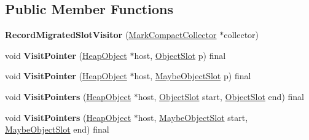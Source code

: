 \subsection*{Public Member Functions}
\begin{DoxyCompactItemize}
\item 
\mbox{\label{classv8_1_1internal_1_1RecordMigratedSlotVisitor_a293de89eb85dd53543ee17300e50f246}} 
{\bfseries Record\+Migrated\+Slot\+Visitor} (\mbox{\hyperlink{classv8_1_1internal_1_1MarkCompactCollector}{Mark\+Compact\+Collector}} $\ast$collector)
\item 
\mbox{\label{classv8_1_1internal_1_1RecordMigratedSlotVisitor_a95521fe2007eb5e871833d6822d26628}} 
void {\bfseries Visit\+Pointer} (\mbox{\hyperlink{classv8_1_1internal_1_1HeapObject}{Heap\+Object}} $\ast$host, \mbox{\hyperlink{classv8_1_1internal_1_1ObjectSlot}{Object\+Slot}} p) final
\item 
\mbox{\label{classv8_1_1internal_1_1RecordMigratedSlotVisitor_a78d47a48da4aa446003f8e91bda66d94}} 
void {\bfseries Visit\+Pointer} (\mbox{\hyperlink{classv8_1_1internal_1_1HeapObject}{Heap\+Object}} $\ast$host, \mbox{\hyperlink{classv8_1_1internal_1_1MaybeObjectSlot}{Maybe\+Object\+Slot}} p) final
\item 
\mbox{\label{classv8_1_1internal_1_1RecordMigratedSlotVisitor_a437a096ec8e71de7039dc9e1034d63e0}} 
void {\bfseries Visit\+Pointers} (\mbox{\hyperlink{classv8_1_1internal_1_1HeapObject}{Heap\+Object}} $\ast$host, \mbox{\hyperlink{classv8_1_1internal_1_1ObjectSlot}{Object\+Slot}} start, \mbox{\hyperlink{classv8_1_1internal_1_1ObjectSlot}{Object\+Slot}} end) final
\item 
\mbox{\label{classv8_1_1internal_1_1RecordMigratedSlotVisitor_a0efe11b186d86f633f615656fd215cd3}} 
void {\bfseries Visit\+Pointers} (\mbox{\hyperlink{classv8_1_1internal_1_1HeapObject}{Heap\+Object}} $\ast$host, \mbox{\hyperlink{classv8_1_1internal_1_1MaybeObjectSlot}{Maybe\+Object\+Slot}} start, \mbox{\hyperlink{classv8_1_1internal_1_1MaybeObjectSlot}{Maybe\+Object\+Slot}} end) final
\item 

\end{DoxyCompactItemize}
